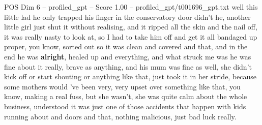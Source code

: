 \begin{textsample}{POS Dim 6 – profiled\_gpt – Score 1.00 – profiled\_gpt/t001696\_gpt.txt}  \label{ex:f6_pos_036}
well this little lad he only trapped his finger in the conservatory door didn't he, another little girl just shut it without realising, and it ripped all the skin and the nail off, it was really nasty to look at, so I had to take him off and get it all bandaged up proper, you know, sorted out so it was clean and covered and that, and in the end he was \textbf{alright}, healed up and everything, and what struck me was he was fine about it really, brave as anything, and his mum was fine as well, she didn't kick off or start shouting or anything like that, just took it in her stride, because some mothers would ’ve been very, very upset over something like that, you know, making a real fuss, but she wasn't, she was quite calm about the whole business, understood it was just one of those accidents that happen with kids running about and doors and that, nothing malicious, just bad luck really.

\end{textsample}
